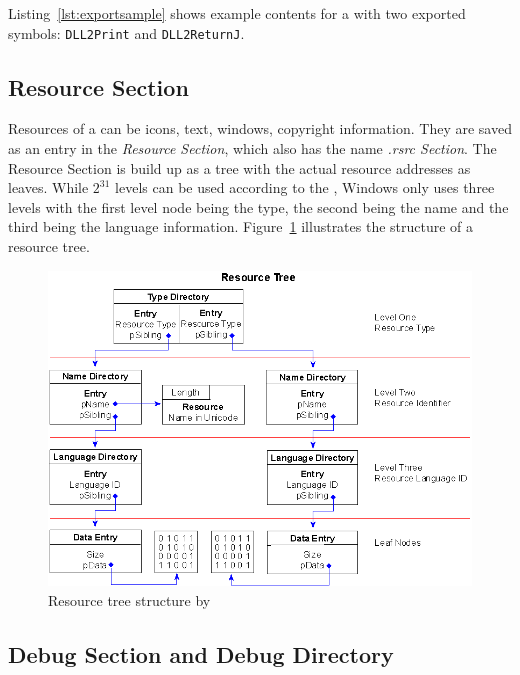 Listing~\ref{lst:exportsample} shows example contents for a \DLL{} with two exported symbols: \texttt{DLL2Print} and \texttt{DLL2ReturnJ}.



\subsection*{Resource Section}

Resources of a \PE{} can be \ia{} icons, text, windows, copyright information. They are saved as an entry in the \emph{Resource Section}, which also has the name \emph{.rsrc Section}. The Resource Section is build up as a tree with the actual resource addresses as leaves. While \(2^{31}\) levels can be used according to the \PECOFF{} \cite[]{pespec}, Windows only uses three levels with the first level node being the type, the second being the name and the third being the language information. Figure~\ref{fig:resourcetree} illustrates the structure of a resource tree.

\begin{figure}
\includegraphics[width=.98\textwidth, height=\textheight,keepaspectratio]{graphics/resourcetree}
\caption{ Resource tree structure by }
\label{fig:resourcetree} 
\end{figure}

\subsection*{Debug Section and Debug Directory}

